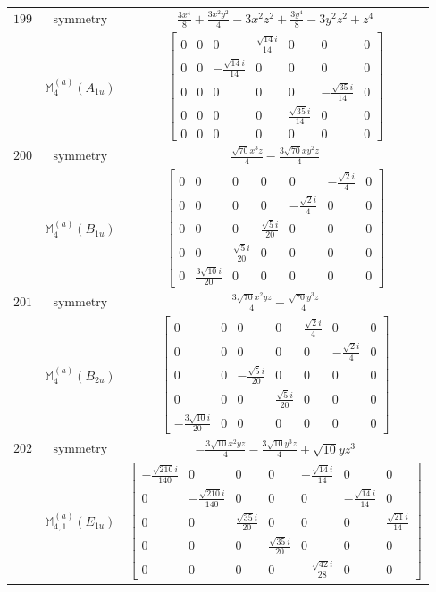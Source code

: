 \documentclass[fleqn,8pt,landscape]{jsarticle}
\begin{document}
\begin{longtable}{ccc}
$ 199 $ & $ \text{symmetry} $ & $ \frac{3 x^{4}}{8} + \frac{3 x^{2} y^{2}}{4} - 3 x^{2} z^{2} + \frac{3 y^{4}}{8} - 3 y^{2} z^{2} + z^{4} $ \\
$  $ & $ \mathbb{M}_{4}^{(a)}(A_{1u}) $ & $ \begin{bmatrix} 0 & 0 & 0 & \frac{\sqrt{14} i}{14} & 0 & 0 & 0 \\ 0 & 0 & - \frac{\sqrt{14} i}{14} & 0 & 0 & 0 & 0 \\ 0 & 0 & 0 & 0 & 0 & - \frac{\sqrt{35} i}{14} & 0 \\ 0 & 0 & 0 & 0 & \frac{\sqrt{35} i}{14} & 0 & 0 \\ 0 & 0 & 0 & 0 & 0 & 0 & 0 \end{bmatrix} $ \\ \hline
$ 200 $ & $ \text{symmetry} $ & $ \frac{\sqrt{70} x^{3} z}{4} - \frac{3 \sqrt{70} x y^{2} z}{4} $ \\
$  $ & $ \mathbb{M}_{4}^{(a)}(B_{1u}) $ & $ \begin{bmatrix} 0 & 0 & 0 & 0 & 0 & - \frac{\sqrt{2} i}{4} & 0 \\ 0 & 0 & 0 & 0 & - \frac{\sqrt{2} i}{4} & 0 & 0 \\ 0 & 0 & 0 & \frac{\sqrt{5} i}{20} & 0 & 0 & 0 \\ 0 & 0 & \frac{\sqrt{5} i}{20} & 0 & 0 & 0 & 0 \\ 0 & \frac{3 \sqrt{10} i}{20} & 0 & 0 & 0 & 0 & 0 \end{bmatrix} $ \\ \hline
$ 201 $ & $ \text{symmetry} $ & $ \frac{3 \sqrt{70} x^{2} y z}{4} - \frac{\sqrt{70} y^{3} z}{4} $ \\
$  $ & $ \mathbb{M}_{4}^{(a)}(B_{2u}) $ & $ \begin{bmatrix} 0 & 0 & 0 & 0 & \frac{\sqrt{2} i}{4} & 0 & 0 \\ 0 & 0 & 0 & 0 & 0 & - \frac{\sqrt{2} i}{4} & 0 \\ 0 & 0 & - \frac{\sqrt{5} i}{20} & 0 & 0 & 0 & 0 \\ 0 & 0 & 0 & \frac{\sqrt{5} i}{20} & 0 & 0 & 0 \\ - \frac{3 \sqrt{10} i}{20} & 0 & 0 & 0 & 0 & 0 & 0 \end{bmatrix} $ \\ \hline
$ 202 $ & $ \text{symmetry} $ & $ - \frac{3 \sqrt{10} x^{2} y z}{4} - \frac{3 \sqrt{10} y^{3} z}{4} + \sqrt{10} y z^{3} $ \\
$  $ & $ \mathbb{M}_{4,1}^{(a)}(E_{1u}) $ & $ \begin{bmatrix} - \frac{\sqrt{210} i}{140} & 0 & 0 & 0 & - \frac{\sqrt{14} i}{14} & 0 & 0 \\ 0 & - \frac{\sqrt{210} i}{140} & 0 & 0 & 0 & - \frac{\sqrt{14} i}{14} & 0 \\ 0 & 0 & \frac{\sqrt{35} i}{20} & 0 & 0 & 0 & \frac{\sqrt{21} i}{14} \\ 0 & 0 & 0 & \frac{\sqrt{35} i}{20} & 0 & 0 & 0 \\ 0 & 0 & 0 & 0 & - \frac{\sqrt{42} i}{28} & 0 & 0 \end{bmatrix} $ \\ \hline

\end{longtable}
\end{document}
